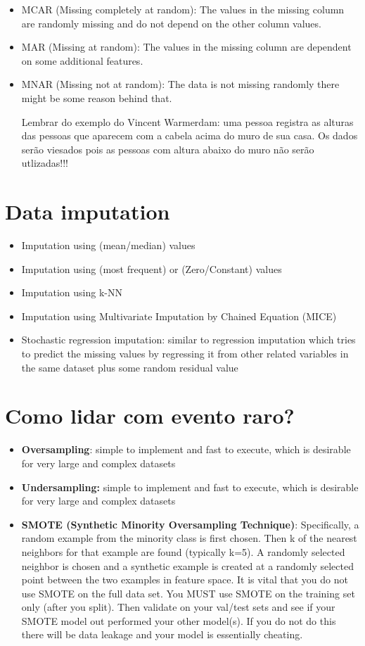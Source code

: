 \begin{itemize}
    \item MCAR (Missing completely at random): The values in the missing column are randomly missing and do not depend on the other column values.
    \item MAR (Missing at random): The values in the missing column are dependent on some additional features.
    \item MNAR (Missing not at random): The data is not missing randomly there might be some reason behind that.
    
    Lembrar do exemplo do Vincent Warmerdam: uma pessoa registra as alturas das pessoas que aparecem com a cabela acima do muro de sua casa. Os dados serão viesados pois as pessoas com altura abaixo do muro não serão utlizadas!!!
\end{itemize}

\section{Data imputation}

\begin{itemize}
    \item Imputation using (mean/median) values
    \item Imputation using (most frequent) or (Zero/Constant) values
    \item Imputation using k-NN
    \item Imputation using Multivariate Imputation by Chained Equation (MICE)
    \item Stochastic regression imputation: similar to regression imputation which tries to predict the missing values by regressing it from other related variables in the same dataset plus some random residual value
\end{itemize}

\section{Como lidar com evento raro?}
\begin{itemize}
    \item \textbf{Oversampling}: simple to implement and fast to execute, which is desirable for very large and complex datasets
    \item \textbf{Undersampling:} simple to implement and fast to execute, which is desirable for very large and complex datasets
    \item \textbf{SMOTE (Synthetic Minority Oversampling Technique)}: Specifically, a random example from the minority class is first chosen. Then k of the nearest neighbors for that example are found (typically k=5). A randomly selected neighbor is chosen and a synthetic example is created at a randomly selected point between the two examples in feature space. It is vital that you do not use SMOTE on the full data set. You MUST use SMOTE on the training set only (after you split). Then validate on your val/test sets and see if your SMOTE model out performed your other model(s). If you do not do this there will be data leakage and your model is essentially cheating.
\end{itemize}


